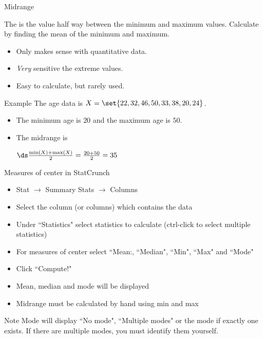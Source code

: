 \documentclass[xcolor=table]{beamer}
\begin{document}
\begin{frame}{Midrange}
\begin{block}{}
\large
The  is the value half way between the minimum and maximum values. Calculate by finding the mean of the minimum and maximum.
\begin{itemize}
\item Only makes sense with quantitative data.
\item \emph{Very} sensitive the extreme values.
\item Easy to calculate, but rarely used.
\end{itemize}
\end{block}

\pause
\begin{exampleblock}{Example}
The age data is $X = \set{22, 32, 46, 50, 33, 38, 20, 24}$.
\begin{itemize}
\item The minimum age is $20$ and the maximum age is $50$.
\item The midrange is \\
\smallskip
{\centering
$\ds \frac {\min(X) + \max(X)}{2} = \frac {20 + 50}{2} = 35$
\par}
\end{itemize}
\smallskip
\end{exampleblock}

\end{frame}

\begin{frame}{Measures of center in StatCrunch}
\begin{block}{}
\begin{itemize}
\item Stat $\to$ Summary Stats $\to$ Columns
\item Select the column (or columns) which contains the data
\item Under ``Statistics" select statistics to calculate (ctrl-click to select multiple statistics)
\item For measures of center select ``Mean:, ``Median", ``Min", ``Max" and ``Mode"
\item Click ``Compute!"
\item Mean, median and mode will be displayed
\item Midrange must be calculated by hand using min and max
\end{itemize}
\end{block}

\begin{alertblock}{Note}
Mode will display ``No mode", ``Multiple modes" or the mode if exactly one exists. If there are multiple modes, you must identify them yourself.
\end{alertblock}
\end{frame}
\end{document}
